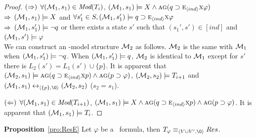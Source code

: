 \documentclass{article}
\begin{document}
\begin{proof}
$(\Rightarrow)$ $\forall ({\cal M}_1,s_1) \in \textit{Mod}(T_i)$, \ie $({\cal M}_1,s_1) \models X \wedge \textsc{a}\textsc{g}(q \supset \textsc{e}_{{\langle{ind}\rangle}}\textsc{x} \varphi)$\\
$\Rightarrow$ $({\cal M}_1,s_1) \models X$ and $\forall s_1'\in S, ({\cal M}_1,s_1') \models q \supset \textsc{e}_{{\langle{ind}\rangle}} \textsc{x} \varphi$\\
$\Rightarrow$ $({\cal M}_1,s_1') \models \neg q$ or there exists a state $s'$ such that $(s_1', s') \in [ind]$ and $({\cal M}_1,s') \models \varphi$ \\
We can construct an \Ind-model structure ${\cal M}_2$ as follows. ${\cal M}_2$ is the same with ${\cal M}_1$ when $({\cal M}_1,s_1') \models \neg q$. When $({\cal M}_1,s_1') \models q$, ${\cal M}_2$ is identical to ${\cal M}_1$ except for $s'$ there is $L_2(s') = L_1(s') \cup \{p\}$. It is apparent that $({\cal M}_2,s_1) \models \textsc{a}\textsc{g}(q\supset \textsc{e}_{{\langle{ind}\rangle}} \textsc{x} p) \wedge \textsc{a}\textsc{g}(p \supset \varphi)$, $({\cal M}_2,s_2) \models T_{i+1}$ and $(\Hm_1, s_1) \lrto_{\tuple{\{p\}, {\O}}} (\Hm_2, s_2)$ ($s_2=s_1$).

 $(\Leftarrow)$ $\forall ({\cal M}_1, s_1) \in \textit{Mod}(T_{i+1})$, \ie $({\cal M}_1,s_1) \models X \wedge \textsc{a}\textsc{g}(q\supset \textsc{e}_{{\langle{ind}\rangle}} \textsc{x} p) \wedge \textsc{a}\textsc{g}(p \supset \varphi)$. It is apparent that $({\cal M}_1, s_1) \models T_i$.

\end{proof}


\textbf{Proposition}~\ref{pro:ResE}
 Let $\varphi$ be a \CTL\ formula,
 then $T_{\varphi} \equiv_{\tuple{V \cup V', {\O}}} Res$.
\end{document}
